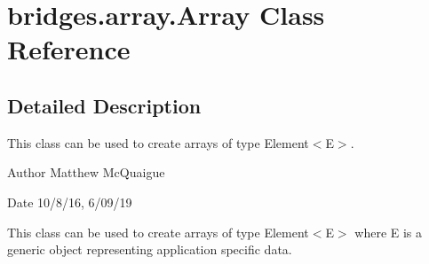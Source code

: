 \hypertarget{classbridges_1_1array_1_1_array}{}\section{bridges.\+array.\+Array Class Reference}
\label{classbridges_1_1array_1_1_array}


\subsection{Detailed Description}
This class can be used to create arrays of type Element$<$\+E$>$. 

\begin{DoxyAuthor}{Author}
Matthew Mc\+Quaigue
\end{DoxyAuthor}
\begin{DoxyDate}{Date}
10/8/16, 6/09/19
\end{DoxyDate}
This class can be used to create arrays of type Element$<$\+E$>$ where E is a generic object representing application specific data.

